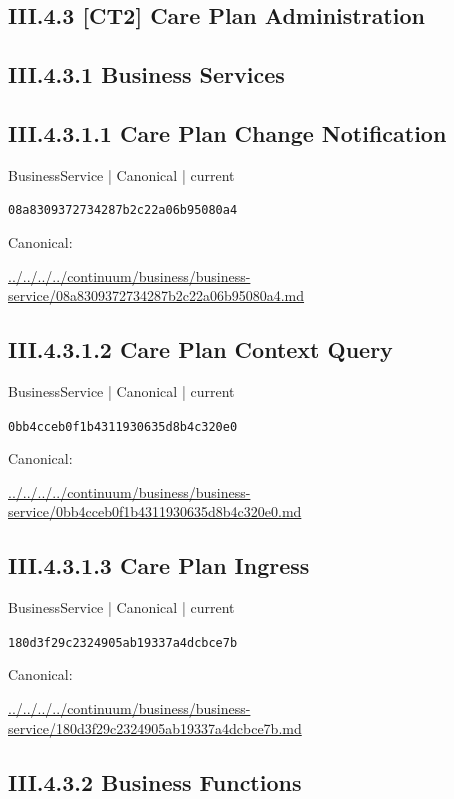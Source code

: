 \documentclass[10pt,a4paper]{article}
\begin{document}
\subsection*{III.4.3 [CT2] Care Plan Administration}
\subsection*{III.4.3.1 Business Services}
\subsection*{III.4.3.1.1 Care Plan Change Notification}
{\small BusinessService | Canonical | current}\par
\texttt{08a8309372734287b2c22a06b95080a4}\par
Canonical: \par
{\footnotesize\url{../../../../continuum/business/business-service/08a8309372734287b2c22a06b95080a4.md}}\par
\subsection*{III.4.3.1.2 Care Plan Context Query}
{\small BusinessService | Canonical | current}\par
\texttt{0bb4cceb0f1b4311930635d8b4c320e0}\par
Canonical: \par
{\footnotesize\url{../../../../continuum/business/business-service/0bb4cceb0f1b4311930635d8b4c320e0.md}}\par
\subsection*{III.4.3.1.3 Care Plan Ingress}
{\small BusinessService | Canonical | current}\par
\texttt{180d3f29c2324905ab19337a4dcbce7b}\par
Canonical: \par
{\footnotesize\url{../../../../continuum/business/business-service/180d3f29c2324905ab19337a4dcbce7b.md}}\par
\subsection*{III.4.3.2 Business Functions}
\end{document}
